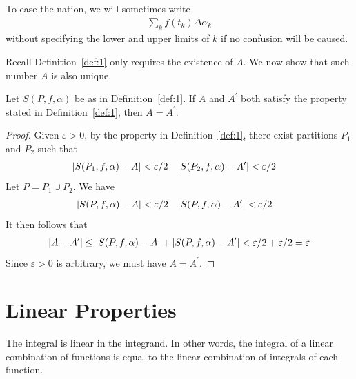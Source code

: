 \documentclass[thmcnt=section, 12pt]{my-elegantbook}
\begin{document}
\begin{note}
    To ease the nation, we will sometimes write
    \begin{align*}
        \sum_{k} f(t_k) \Delta \alpha_k
    \end{align*}
    without specifying the lower and upper limits of $k$ if no confusion will be caused.
\end{note}


\par Recall Definition~\ref{def:1} only requires the existence of $A$. We now show that such number $A$ is also unique.

\begin{proposition} \label{pro:3}
    Let $S(P,f,\alpha)$ be as in Definition~\ref{def:1}. If $A$ and $A^\prime$ both satisfy the property stated in Definition~\ref{def:1}, then $A = A^\prime$.
\end{proposition}

\begin{proof}
    Given $\varepsilon > 0$, by the property in Definition~\ref{def:1}, there exist partitions $P_1$ and $P_2$ such that
    \begin{align*}
        \left\lvert S(P_1,f,\alpha) - A \right\rvert        & < \varepsilon / 2 &
        \left\lvert S(P_2,f,\alpha) - A^\prime \right\rvert & < \varepsilon / 2
    \end{align*}
    Let $P = P_1 \cup P_2$. We have
    \begin{align*}
        \left\lvert S(P,f,\alpha) - A \right\rvert        & < \varepsilon / 2 &
        \left\lvert S(P,f,\alpha) - A^\prime \right\rvert & < \varepsilon / 2
    \end{align*}
    It then follows that
    \begin{align*}
        \left\lvert A - A^\prime \right\rvert
        \leq \left\lvert S(P,f,\alpha) - A \right\rvert +
        \left\lvert S(P,f,\alpha) - A^\prime \right\rvert
        < \varepsilon / 2 + \varepsilon / 2
        = \varepsilon
    \end{align*}
    Since $\varepsilon > 0$ is arbitrary, we must have $A = A^\prime$.
\end{proof}


\section{Linear Properties}


\par The integral is linear in the integrand. In other words, the integral of a linear combination of functions is equal to the linear combination of integrals of each function.
\end{document}
